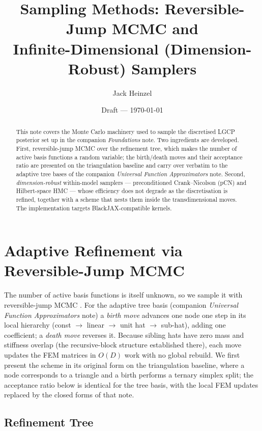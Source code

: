 \documentclass[11pt]{article}
\title{Sampling Methods: Reversible-Jump MCMC and\\
Infinite-Dimensional (Dimension-Robust) Samplers}
\author{Jack Heinzel}
\date{Draft --- \today}
\begin{document}
\maketitle

\begin{abstract}
This note covers the Monte Carlo machinery used to sample the discretised LGCP
posterior set up in the companion \emph{Foundations} note.  Two ingredients are
developed.  First, reversible-jump MCMC \citep{green1995} over the refinement
tree, which makes the number of active basis functions a random variable; the
birth/death moves and their acceptance ratio are presented on the triangulation
baseline and carry over verbatim to the adaptive tree bases of the companion
\emph{Universal Function Approximators} note.  Second, \emph{dimension-robust}
within-model samplers --- preconditioned Crank--Nicolson (pCN) and Hilbert-space
HMC --- whose efficiency does not degrade as the discretisation is refined,
together with a scheme that nests them inside the transdimensional moves.  The
implementation targets BlackJAX-compatible kernels.
\end{abstract}

\tableofcontents
\bigskip

\section{Adaptive Refinement via Reversible-Jump MCMC}
\label{sec:rjmcmc}

The number of active basis functions is itself unknown, so we sample it with
reversible-jump MCMC \citep{green1995}.  For the adaptive tree basis (companion
\emph{Universal Function Approximators} note) a \emph{birth move} advances one
node one step in its local hierarchy (const $\to$ linear $\to$ unit hat $\to$
sub-hat), adding one coefficient; a \emph{death move} reverses it.  Because
sibling hats have zero mass and stiffness overlap (the recursive-block structure
established there), each move updates the FEM matrices in $O(D)$ work with no
global rebuild.  We first present the scheme in its original form on the
triangulation baseline, where a node corresponds to a triangle and a birth
performs a ternary simplex split; the acceptance ratio below is identical for the
tree basis, with the local FEM updates replaced by the closed forms of that note.

\subsection{Refinement Tree}
\end{document}
